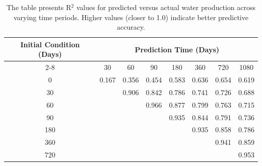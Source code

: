 \begin{table}
    \centering
    \caption{R$^2$ of Predicted vs Actual Water Production at Different Time Periods}
    \label{tab:r2_water}
    \begin{tabular}{c|ccccccc}
        \toprule
        \multirow{2}{*}{Initial Condition (Days)} & \multicolumn{7}{c}{Prediction Time (Days)} \\
        \cmidrule{2-8}
        & 30 & 60 & 90 & 180 & 360 & 720 & 1080 \\
        \midrule
        0   & 0.167 & 0.356 & 0.454 & 0.583 & 0.636 & 0.654 & 0.619 \\
        30   &  & 0.906 & 0.842 & 0.786 & 0.741 & 0.726 & 0.688 \\
        60   &  &  & 0.966 & 0.877 & 0.799 & 0.763 & 0.715 \\
        90   &  &  &  & 0.935 & 0.844 & 0.791 & 0.736 \\
        180   &  &  &  &  & 0.935 & 0.858 & 0.786 \\
        360   &  &  &  &  &  & 0.941 & 0.859 \\
        720   &  &  &  &  &  &  & 0.953 \\
        \bottomrule
    \end{tabular}
    \vspace{0.2cm}
    \caption*{The table presents R$^2$ values for predicted versus actual water production across varying time periods. Higher values (closer to 1.0) indicate better predictive accuracy.}
\end{table}